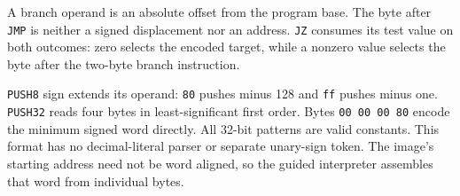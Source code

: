 A branch operand is an absolute offset from the program base. The byte after
\texttt{JMP} is neither a signed displacement nor an address. \texttt{JZ} consumes
its test value on both outcomes: zero selects the encoded target, while a nonzero
value selects the byte after the two-byte branch instruction.

\texttt{PUSH8} sign extends its operand: \texttt{80} pushes minus 128 and
\texttt{ff} pushes minus one. \texttt{PUSH32} reads four bytes in least-significant
first order. Bytes \texttt{00 00 00 80} encode the minimum signed word directly.
All 32-bit patterns are valid constants. This format has no decimal-literal parser
or separate unary-sign token. The image's starting address need not be word aligned,
so the guided interpreter assembles that word from individual bytes.
